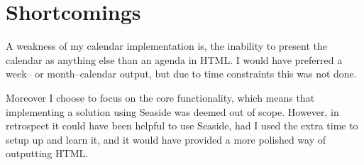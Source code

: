 \section{Shortcomings}
A weakness of my calendar implementation is, the inability to present the calendar as anything else than an agenda in HTML.
I would have preferred a week-- or month--calendar output, but due to time constraints this was not done.

Moreover I choose to focus on the core functionality, which means that implementing a solution using Seaside was deemed out of scope.
However, in retrospect it could have been helpful to use Seaside, had I used the extra time to setup up and learn it, and it would have provided a more polished way of outputting HTML.
